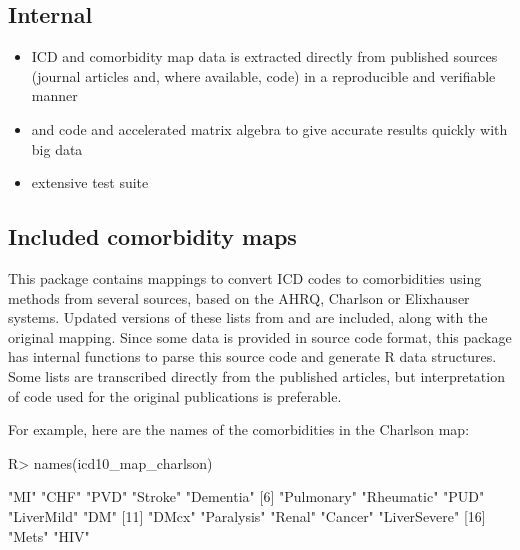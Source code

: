 \documentclass[article]{jss}
\providecommand{\tightlist}{%
  \setlength{\itemsep}{0pt}\setlength{\parskip}{0pt}}
\begin{document}
\hypertarget{internal}{%
\subsection{Internal}\label{internal}}

\begin{itemize}
\tightlist
\item
  ICD and comorbidity map data is extracted directly from published
  sources (journal articles and, where available,  code)
  in a reproducible and verifiable manner
\item
   and  code and accelerated matrix algebra to
  give accurate results quickly with big data
\item
  extensive test suite
\end{itemize}

\hypertarget{included-comorbidity-maps}{%
\subsection{Included comorbidity maps}\label{included-comorbidity-maps}}

This package contains mappings to convert ICD codes to comorbidities
using methods from several sources, based on the AHRQ, Charlson or
Elixhauser systems. Updated versions of these lists from
\citet{AgencyforHealthcareResearchandQuality_Elixhausercomorbiditysoftware_2018}
and \citet{quan_updating_2011} are included, along with the original
\citet{elixhauser_comorbidity_1998} mapping. Since some data is provided
in  source code format, this package has internal
functions to parse this  source code and generate R data
structures. Some lists are transcribed directly from the published
articles, but interpretation of  code used for the
original publications is preferable.

For example, here are the names of the comorbidities in the Charlson
map:

\begin{CodeChunk}

\begin{CodeInput}
R> names(icd10_map_charlson)
\end{CodeInput}

\begin{CodeOutput}
 [1] "MI"          "CHF"         "PVD"         "Stroke"      "Dementia"   
 [6] "Pulmonary"   "Rheumatic"   "PUD"         "LiverMild"   "DM"         
[11] "DMcx"        "Paralysis"   "Renal"       "Cancer"      "LiverSevere"
[16] "Mets"        "HIV"        
\end{CodeOutput}
\end{CodeChunk}
\end{document}
